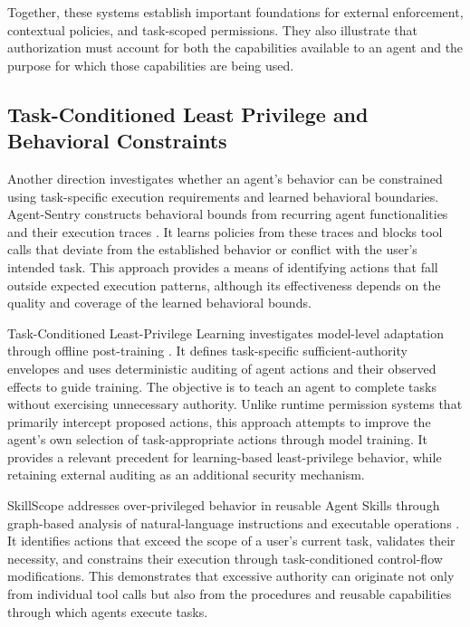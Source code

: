 \documentclass[10pt,conference]{IEEEtran}
\begin{document}
Together, these systems establish important foundations for external enforcement, contextual policies, and task-scoped permissions. They also illustrate that authorization must account for both the capabilities available to an agent and the purpose for which those capabilities are being used.

\subsection{Task-Conditioned Least Privilege and Behavioral Constraints}

Another direction investigates whether an agent's behavior can be constrained using task-specific execution requirements and learned behavioral boundaries. Agent-Sentry constructs behavioral bounds from recurring agent functionalities and their execution traces \cite{sequeira2026agentsentry}. It learns policies from these traces and blocks tool calls that deviate from the established behavior or conflict with the user's intended task. This approach provides a means of identifying actions that fall outside expected execution patterns, although its effectiveness depends on the quality and coverage of the learned behavioral bounds.

Task-Conditioned Least-Privilege Learning investigates model-level adaptation through offline post-training \cite{tu2026tasklp}. It defines task-specific sufficient-authority envelopes and uses deterministic auditing of agent actions and their observed effects to guide training. The objective is to teach an agent to complete tasks without exercising unnecessary authority. Unlike runtime permission systems that primarily intercept proposed actions, this approach attempts to improve the agent's own selection of task-appropriate actions through model training. It provides a relevant precedent for learning-based least-privilege behavior, while retaining external auditing as an additional security mechanism.

SkillScope addresses over-privileged behavior in reusable Agent Skills through graph-based analysis of natural-language instructions and executable operations \cite{wu2026skillscope}. It identifies actions that exceed the scope of a user's current task, validates their necessity, and constrains their execution through task-conditioned control-flow modifications. This demonstrates that excessive authority can originate not only from individual tool calls but also from the procedures and reusable capabilities through which agents execute tasks.
\end{document}
